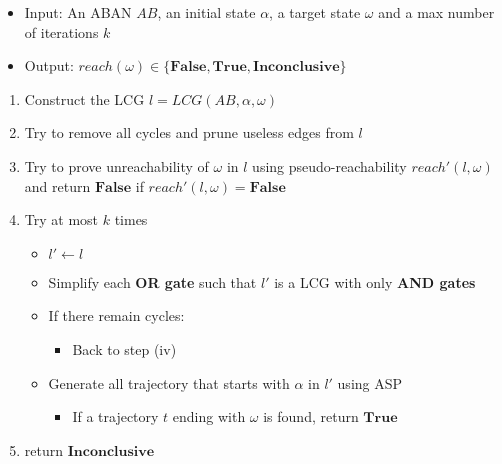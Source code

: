 \begin{itemize}
    \item Input: An ABAN $AB$, an initial state $\alpha$, a target state $\omega$ and a max number of iterations $k$
    \item Output: $reach(\omega)\in\{\mathbf{False},\mathbf{True},\mathbf{Inconclusive}\}$
\end{itemize}
\begin{enumerate}
    \item Construct the LCG $l=LCG(AB,\alpha,\omega)$
    \item Try to remove all cycles and prune useless edges from $l$
    \item Try to prove unreachability of $\omega$ in $l$ using pseudo-reachability $reach'(l,\omega)$ and return $\mathbf{False}$ if $reach'(l,\omega)=\textbf{False}$
    \item Try at most $k$ times
    \begin{itemize}
    \item $l'\gets l$
    \item Simplify each \textbf{OR gate} such that $l'$ is a LCG with only \textbf{AND gates}
    \item If there remain cycles:
        \begin{itemize}
            \item Back to step (iv)
        \end{itemize}
    \item Generate all trajectory that starts with $\alpha$ in $l'$ using ASP
    \begin{itemize}
        \item If a trajectory $t$ ending with $\omega$ is found, return $\mathbf{True}$
    \end{itemize}
    \end{itemize}
    \item return $\mathbf{Inconclusive}$
\end{enumerate}

